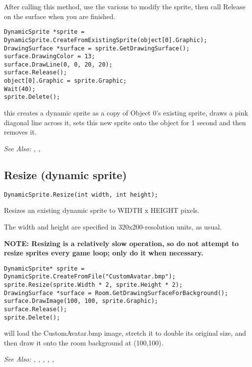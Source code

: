After calling this method, use the various  to modify the
sprite, then call Release on the surface when you are finished.

\begin{verbatim}
DynamicSprite *sprite = DynamicSprite.CreateFromExistingSprite(object[0].Graphic);
DrawingSurface *surface = sprite.GetDrawingSurface();
surface.DrawingColor = 13;
surface.DrawLine(0, 0, 20, 20);
surface.Release();
object[0].Graphic = sprite.Graphic;
Wait(40);
sprite.Delete();
\end{verbatim}
this creates a dynamic sprite as a copy of Object 0's existing sprite, draws
a pink diagonal line across it, sets this new sprite onto the object for 1 second
and then removes it.

\it{See Also:} ,
,


\subsection{Resize (dynamic sprite)}\label{DynamicSprite.Resize}%

\begin{verbatim}
DynamicSprite.Resize(int width, int height);
\end{verbatim}
Resizes an existing dynamic sprite to WIDTH x HEIGHT pixels.

The width and height are specified in 320x200-resolution units, as usual.

\bf{NOTE:} Resizing is a relatively slow operation, so do not attempt to resize sprites
every game loop; only do it when necessary.

\begin{verbatim}
DynamicSprite* sprite = DynamicSprite.CreateFromFile("CustomAvatar.bmp");
sprite.Resize(sprite.Width * 2, sprite.Height * 2);
DrawingSurface *surface = Room.GetDrawingSurfaceForBackground();
surface.DrawImage(100, 100, sprite.Graphic);
surface.Release();
sprite.Delete();
\end{verbatim}
will load the CustomAvatar.bmp image, stretch it to double its original size, and then
draw it onto the room background at (100,100).

\it{See Also:} ,
,
,
,
,


